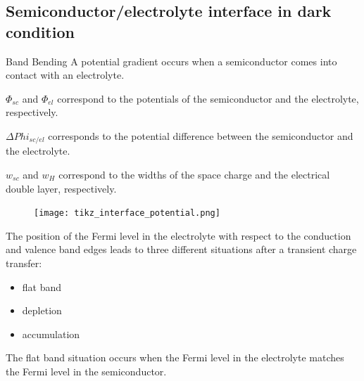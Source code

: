 \documentclass[10pt,compress,handout]{beamer}
\begin{document}
\subsection{Semiconductor/electrolyte interface in dark condition}
    \begin{frame}[allowframebreaks=1.0]{Band Bending}
            A potential gradient occurs when a semiconductor comes into contact with an 
            electrolyte.
            
            $\Phi_{sc}$ and $\Phi_{el}$ correspond to the 
            potentials of the semiconductor and the electrolyte, respectively. 
            
            $\Delta Phi _{sc/el}$ corresponds to the potential difference between 
            the semiconductor and the electrolyte. 
            
            $w_{sc}$ and $w_{H}$ correspond to 
            the widths of the space charge and the electrical double layer, 
            respectively.

        \begin{figure}[h]
            \centering
            \texttt{[image: tikz\_interface\_potential.png]}
            \label{fig_interface_potential}
        \end{figure}

        \framebreak
            
        The position of the Fermi level in the electrolyte with respect to the 
        conduction and valence band edges leads to three different situations after 
         a transient charge transfer:
        \begin{itemize}
            \item flat band
            \item depletion
            \item accumulation
        \end{itemize}
        
        The flat band situation occurs when the Fermi level in the electrolyte 
        matches the Fermi level in the semiconductor. 
        

\end{frame}
\end{document}
